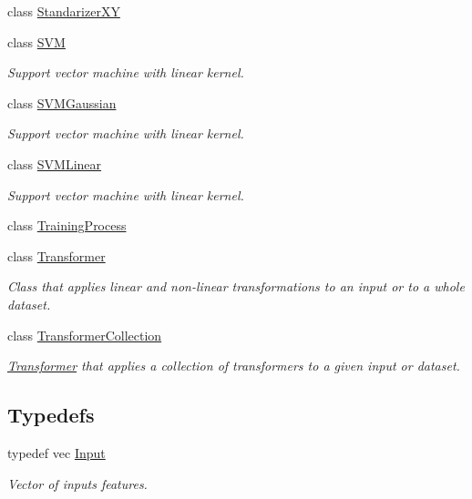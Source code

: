 \begin{DoxyCompactItemize}
class \hyperlink{classhappyml_1_1StandarizerXY}{Standarizer\+XY}
\item 
class \hyperlink{classhappyml_1_1SVM}{S\+VM}
\begin{DoxyCompactList}\small\item\em Support vector machine with linear kernel. \end{DoxyCompactList}\item 
class \hyperlink{classhappyml_1_1SVMGaussian}{S\+V\+M\+Gaussian}
\begin{DoxyCompactList}\small\item\em Support vector machine with linear kernel. \end{DoxyCompactList}\item 
class \hyperlink{classhappyml_1_1SVMLinear}{S\+V\+M\+Linear}
\begin{DoxyCompactList}\small\item\em Support vector machine with linear kernel. \end{DoxyCompactList}\item 
class \hyperlink{classhappyml_1_1TrainingProcess}{Training\+Process}
\item 
class \hyperlink{classhappyml_1_1Transformer}{Transformer}
\begin{DoxyCompactList}\small\item\em Class that applies linear and non-\/linear transformations to an input or to a whole dataset. \end{DoxyCompactList}\item 
class \hyperlink{classhappyml_1_1TransformerCollection}{Transformer\+Collection}
\begin{DoxyCompactList}\small\item\em \hyperlink{classhappyml_1_1Transformer}{Transformer} that applies a collection of transformers to a given input or dataset. \end{DoxyCompactList}\end{DoxyCompactItemize}
\subsection*{Typedefs}
\begin{DoxyCompactItemize}
\item 
typedef vec \hyperlink{namespacehappyml_a03602d1ec49393790b8a0449f40cd01f}{Input}
\begin{DoxyCompactList}\small\item\em Vector of inputs features. \end{DoxyCompactList}\end{DoxyCompactItemize}
